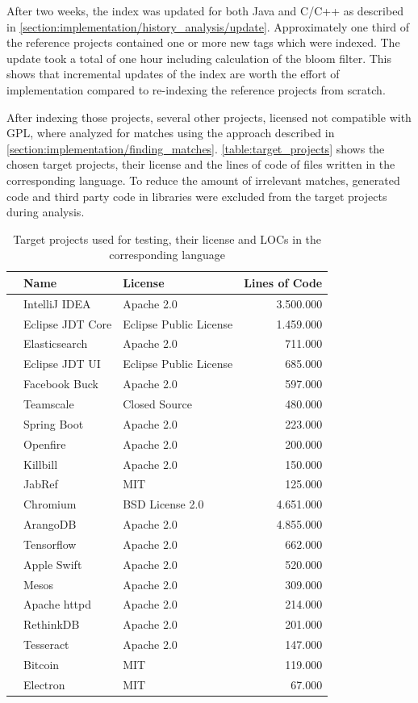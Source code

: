 After two weeks, the index was updated for both Java and C/C++ as described in \autoref{section:implementation/history_analysis/update}.
Approximately one third of the reference projects contained one or more new tags which were indexed.
The update took a total of one hour including calculation of the bloom filter.
This shows that incremental updates of the index are worth the effort of implementation compared to re-indexing the reference projects from scratch.

After indexing those projects, several other projects, licensed not compatible with GPL, where analyzed for matches using the approach described in \autoref{section:implementation/finding_matches}.
\autoref{table:target_projects} shows the chosen target projects, their license and the lines of code of files written in the corresponding language.
To reduce the amount of irrelevant matches, generated code and third party code in libraries were excluded from the target projects during analysis.

\begin{table}[ht]
	\centering
	\begin{tabular}{l|llr}
		& \textbf{Name} & \textbf{License} & \textbf{Lines of Code} \\
		\hline 
		\parbox[t]{2mm}{} 
		& IntelliJ IDEA & Apache 2.0 & 3.500.000 \\
		& Eclipse JDT Core & Eclipse Public License & 1.459.000 \\
		& Elasticsearch & Apache 2.0 & 711.000 \\
		& Eclipse JDT UI & Eclipse Public License & 685.000 \\
		& Facebook Buck & Apache 2.0 & 597.000 \\
		& Teamscale & Closed Source & 480.000 \\
		& Spring Boot & Apache 2.0 & 223.000 \\
		& Openfire & Apache 2.0 & 200.000 \\
		& Killbill & Apache 2.0 & 150.000 \\
		& JabRef & MIT & 125.000 \\
		\hline 
		\parbox[t]{2mm}{} 
		& Chromium & BSD License 2.0 & 4.651.000 \\
		& ArangoDB & Apache 2.0 & 4.855.000 \\
		& Tensorflow & Apache 2.0 & 662.000 \\
		& Apple Swift & Apache 2.0 & 520.000 \\
		& Mesos & Apache 2.0 & 309.000 \\
		& Apache httpd & Apache 2.0 & 214.000 \\
		& RethinkDB & Apache 2.0 & 201.000 \\
		& Tesseract & Apache 2.0 & 147.000 \\
		& Bitcoin & MIT & 119.000 \\
		& Electron & MIT & 67.000 \\
	\end{tabular}
	\caption{Target projects used for testing, their license and LOCs in the corresponding language}\label{table:target_projects}
\end{table}

